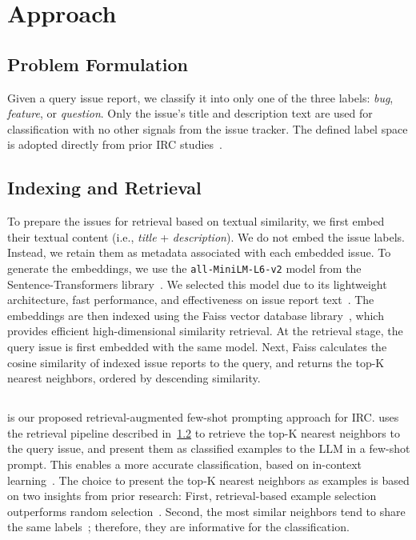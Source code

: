 
\section{Approach}
\label{sec:03_approach}

\subsection{Problem Formulation}
Given a query issue report, we classify it into only one of the three labels: \textit{bug}, \textit{feature}, or \textit{question}. Only the issue's title and description text are used for classification with no other signals from the issue tracker. The defined label space is adopted directly from prior IRC studies~\cite{aracena2024applyinglargelanguagemodels,aracena2025applying,izadi2022catiss,kallis2019ticket,antoniol2008bug}. 

\subsection{Indexing and Retrieval}
\label{sec:retrieval}
To prepare the issues for retrieval based on textual similarity, we first embed their textual content (i.e., \textit{title} + \textit{description}). We do not embed the issue labels. Instead, we retain them as metadata associated with each embedded issue. To generate the embeddings, we use the \texttt{all-MiniLM-L6-v2} model from the Sentence-Transformers library~\cite{reimers2019sentence}. We selected this model due to its lightweight architecture, fast performance, and effectiveness on issue report text~\cite{huang2025back}. The embeddings are then indexed using the Faiss vector database library~\cite{douze2025faiss}, which provides efficient high-dimensional similarity retrieval. At the retrieval stage, the query issue is first embedded with the same model. Next, Faiss calculates the cosine similarity of indexed issue reports to the query, and returns the top-K nearest neighbors, ordered by descending similarity.


\subsection{\ragtag}
\ragtag is our proposed retrieval-augmented few-shot prompting approach for
IRC. \ragtag uses the retrieval pipeline described in~\cref{sec:retrieval}
to retrieve the top-K nearest neighbors to the query issue, and present
them as classified examples to the LLM in a few-shot prompt. This enables
a more accurate classification, based on in-context
learning~\cite{brown2020language}. The choice to present the top-K nearest
neighbors as examples is based on two insights from prior research: First,
retrieval-based example selection outperforms random
selection~\cite{liu2022makes}. Second, the most similar neighbors tend to
share the same labels~\cite{cover1967nearest}; therefore, they are
informative for the classification.

